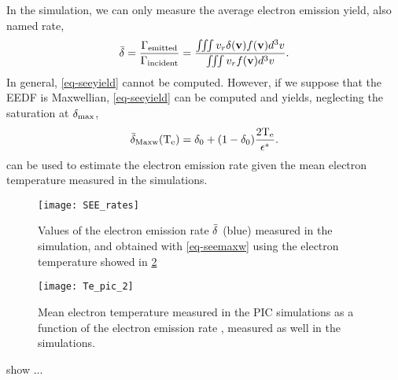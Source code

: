   In the simulation, we can only measure the average electron emission yield, also named rate, 
  \begin{equation} \label{eq-seeyield}
     \bar{\delta }  = \frac{\Gamma_{\rm emitted}}{\Gamma_{\rm incident}} = \frac{\iiint v_r \delta ({\mathbf v}) f({\mathbf v}) d^3v}{\iiint v_r  f({\mathbf v}) d^3v}.
  \end{equation}
  In general, \cref{eq-seeyield} cannot be computed.
  However, if we suppose that the \ac{EEDF} is Maxwellian, \cref{eq-seeyield} can be computed and yields, neglecting the saturation at $\delta _{\rm max} $,
  \begin{equation} \label{eq-seemaxw}
     \bar{\delta }_{\rm Maxw} (\mathrm{T_e}) = \delta _0 + (1 - \delta _0) \frac{2 \mathrm{T_e}}{\epsilon^*}.
  \end{equation}
   can be used to estimate the electron emission rate given the mean electron temperature measured in the simulations.
   
  \begin{figure}[hbtp]
    \centering
    \texttt{[image: SEE\_rates]}
    \caption{Values of the electron emission rate $ \bar{\delta } $ (blue) measured in the simulation, and obtained with \cref{eq-seemaxw} using the electron temperature showed in \cref{fig-Tevsproba} }
    \label{fig-seeparamesMaxw}
  \end{figure}
  
  \begin{figure}[hbtp]
    \centering
    \texttt{[image: Te\_pic\_2]}
    \caption{Mean electron temperature measured in the \ac{PIC} simulations as a function of the electron emission rate \rate, measured as well in the simulations.  }
    \label{fig-Tevsproba}
  \end{figure}
  
   show ...
  
  
   